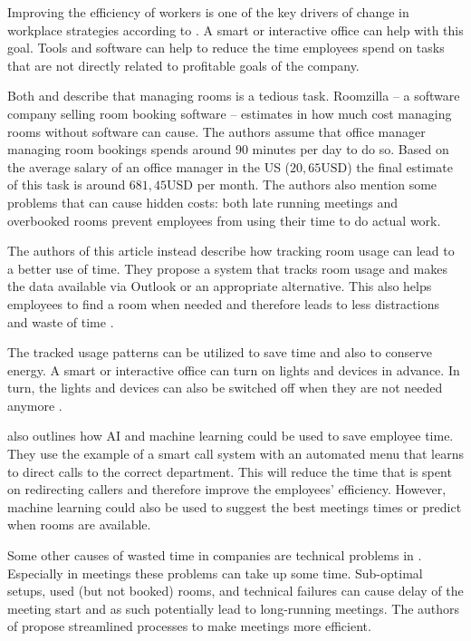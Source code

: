 Improving the efficiency of workers is one of the key drivers of change in workplace strategies according to \cite{hub13}. A smart or interactive office can help with this goal. Tools and software can help to reduce the time employees spend on tasks that are not directly related to profitable goals of the company.

Both \cite{iotagenda} and \cite{roomzilla9} describe that managing rooms is a tedious task. Roomzilla -- a software company selling room booking software -- estimates in \cite{roomzilla9} how much cost managing rooms without software can cause. The authors assume that office manager managing room bookings spends around 90 minutes per day to do so. Based on the average salary of an office manager in the US (\(20,65\text{USD}\)) the final estimate of this task is around \(681,45\text{USD}\) per month. The authors also mention some problems that can cause hidden costs: both late running meetings and overbooked rooms prevent employees from using their time to do actual work. 

The authors of this article instead describe how tracking room usage can lead to a better use of time. They propose a system that tracks room usage and makes the data available via Outlook or an appropriate alternative. This also helps employees to find a room when needed and therefore leads to less distractions and waste of time \cite{iotagenda}.

The tracked usage patterns can be utilized to save time and also to conserve energy. A smart or interactive office can turn on lights and devices in advance. In turn, the lights and devices can also be switched off when they are not needed anymore \cite{hbcommunications}.


\cite{hbcommunications} also outlines how AI and machine learning could be used to save employee time. They use the example of a smart call system with an automated menu that learns to direct calls to the correct department. This will reduce the time that is spent on redirecting callers and therefore improve the employees' efficiency. However, machine learning could also be used to suggest the best meetings times or predict when rooms are available.

Some other causes of wasted time in companies are technical problems in \cite{roomzilla3}. Especially in meetings these problems can take up some time. Sub-optimal setups, used (but not booked) rooms, and technical failures can cause delay of the meeting start and as such potentially lead to long-running meetings. The authors of \cite{roomzilla3} propose streamlined processes to make meetings more efficient. 
